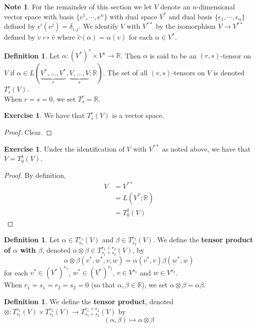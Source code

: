 \documentclass[12pt]{amsart}
\theoremstyle{definition}
\newtheorem{defn}[definition]{Definition}
\newtheorem{note}[definition]{Note}
\newtheorem{ex}[definition]{Exercise}
\newcommand{\al}{\alpha}
\newcommand{\bet}{\beta}
\newcommand{\del}{\delta}
\newcommand{\ep}{\epsilon}
\newcommand{\R}{\mathbb{R}}
\newcommand{\Tn}[1]{T^{r_{#1}}_{s_{#1}}(V)}
\newcommand{\Tnp}{T^{r_1 + r_2}_{s_1 + s_2}(V)}
\begin{document}
	\begin{note}
		For the remainder of this section we let $V$ denote an $n$-dimensional vector space with basis $\{e^1, \cdots, e^n\}$ with dual space $V^*$ and dual basis $\{\ep_1, \cdots, \ep_n\}$ defined by $\ep^i(e^j) = \del_{i,j}$. We identify $V$ with $V^{**}$ by the isomorphism $V \rightarrow V^{**}$ defined by $v \mapsto \hat{v}$ where $\hat{v}(\al) = \al(v)$ for each $\al \in V^*$. 
	\end{note}	
	
	\begin{defn}
	Let $\al: (V^*)^r \times V^s \rightarrow \R$. Then $\al$ is said to be an $(r,s)$-tensor on $V$ if $\al \in L(\underbrace{V^*, \dots, V^*}_{r}, \underbrace{V, \dots, V}_{s}; \R)$. The set of all $(r,s)$-tensors on $V$ is denoted $T^r_s(V)$. \\
	When $r=s=0$, we set $T^r_s = \R$.
	\end{defn}
	
	\begin{ex}
		We have that $T^r_s(V)$ is a vector space. 
	\end{ex}

	\begin{proof}
		Clear.
	\end{proof}
	
	\begin{ex}
	Under the identification of $V$ with $V^{**}$ as noted above, we have that $V = T^1_0(V)$. 
	\end{ex}
	
	\begin{proof}
	By definition,
	\begin{align*}
	V 
	&= V^{**} \\
	&= L(V^*; \R) \\
	&= T^1_0(V)
	\end{align*}
	\end{proof}
	
	\begin{defn}
	Let $\al \in \Tn{1}$ and $\bet \in \Tn{2}$. We define the \textbf{tensor product of $\al$ with $\bet$}, denoted $\al \otimes \beta \in T^{r_1+r_2}_{s_1+s_2}(V)$, by $$\al \otimes \bet (v^*, w^*, v, w) = \al(v^*, v) \bet(w^*, w)$$ for each $v^* \in (V^*)^{r_1}$, $w^* \in (V^*)^{r_2}$, $v \in V^{s_1}$ and $w \in V^{s_2}$.\\
	When $r_1=s_1=r_2=s_2= 0$ (so that $\al, \bet \in \R$), we set $\al \otimes \bet = \al \bet$.
	\end{defn}
	
	\begin{defn}
	We define the \textbf{tensor product}, denoted $\otimes : \Tn{1} \times  \Tn{2} \rightarrow \Tnp$ by $$(\al, \bet) \mapsto \al \otimes \beta $$   
	\end{defn}
	
\end{document}

